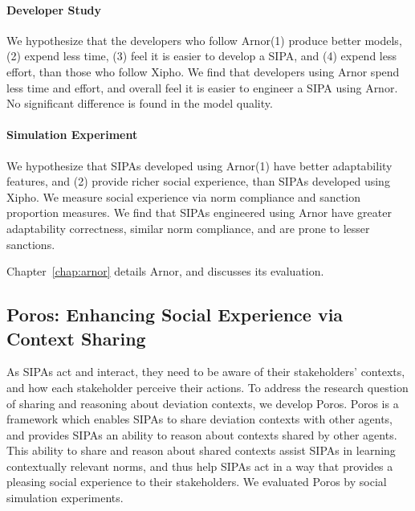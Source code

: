\documentclass[11pt,          %
               phd,           %
               onehalfspacing %
               ]{ncsuthesis}
\newcommand{\frameworkA}{Arnor\xspace}
\newcommand{\frameworkB}{Poros\xspace}
\begin{document}

\paragraph*{Developer Study} 
We hypothesize that the developers who follow \frameworkA (1) produce
better models, (2) expend less time, (3) feel it is easier to develop a
SIPA, and (4) expend less effort, than those who follow Xipho. We find
that developers using \frameworkA spend less time and effort, and
overall feel it is easier to engineer a SIPA using \frameworkA. No
significant difference is found in the model quality.

\paragraph*{Simulation Experiment}
We hypothesize that SIPAs developed using \frameworkA (1) have better
adaptability features, and (2) provide richer social experience, than
SIPAs developed using Xipho. We measure social experience via norm
compliance and sanction proportion measures. We find that SIPAs
engineered using \frameworkA have greater adaptability correctness,
similar norm compliance, and are prone to lesser sanctions.

Chapter~\ref{chap:arnor} details \frameworkA, and discusses its evaluation. 

\subsection[Enhacing Social Experience via Context Sharing]{\frameworkB: Enhancing Social Experience via Context Sharing}

As SIPAs act and interact, they need to be aware of their stakeholders'
contexts, and how each stakeholder perceive their actions. To address
the research question of sharing and reasoning about deviation contexts,
we develop \frameworkB. \frameworkB is a framework which enables SIPAs
to share deviation contexts with other agents, and provides SIPAs an
ability to reason about contexts shared by other agents. This ability to
share and reason about shared contexts assist SIPAs in learning
contextually relevant norms, and thus help SIPAs act in a way that
provides a pleasing social experience to their stakeholders. We
evaluated \frameworkB by social simulation experiments.
\end{document}
